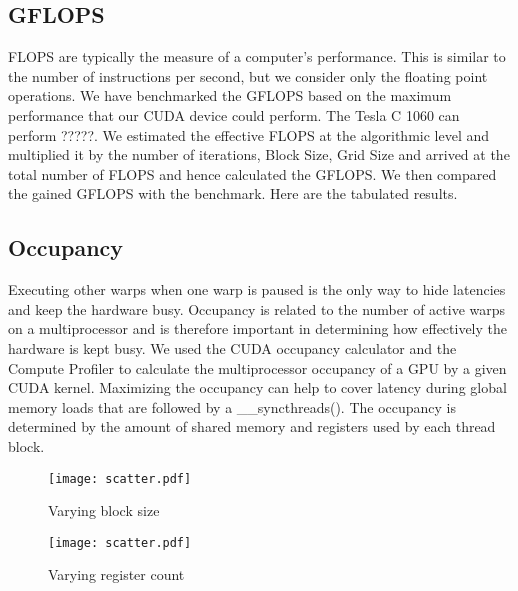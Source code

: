 \documentclass[10pt, twocolumn]{article}
\begin{document}
    \subsection{GFLOPS}
    FLOPS are typically the measure of a computer’s performance.
    This is similar to the number of instructions per second, but we consider only the floating point operations.
    We have benchmarked the GFLOPS based on the maximum performance that our CUDA device could perform.
    The Tesla C 1060 can perform ?????.
    We estimated the effective FLOPS at the algorithmic level and multiplied it by the number of iterations, Block Size, Grid Size and arrived at the total number of FLOPS and hence calculated the GFLOPS.
    We then compared the gained GFLOPS with the benchmark.
    Here are the tabulated results.


    \subsection{Occupancy}
    Executing other warps when one warp is paused is the only way to hide latencies and keep the hardware busy.
    Occupancy is related to the number of active warps on a multiprocessor and is therefore important in determining how effectively the hardware is kept busy.
    We used the CUDA occupancy calculator and the Compute Profiler  to calculate the multiprocessor occupancy of a GPU by a given CUDA kernel.
    Maximizing the occupancy can help to cover latency during global memory loads that are followed by a \_\_syncthreads().
    The occupancy is determined by the amount of shared memory and registers used by each thread block.

    \begin{center}
    \begin{figure}
        \texttt{[image: scatter.pdf]}
        \caption{Varying block size}
        \label{fig:varying_block_size}
    \end{figure}
    \end{center}


    \begin{center}
    \begin{figure}
        \texttt{[image: scatter.pdf]}
        \caption{Varying register count}
        \label{fig:varying_register_count}
    \end{figure}
    \end{center}
\end{document}
